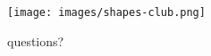 \documentclass[include/preamble.tex]{subfiles}
\begin{document}
\begin{frame}
  \begin{figure}
    \begin{center}
      \texttt{[image: images/shapes-club.png]}
    \end{center}
    \caption{questions?}
  \end{figure}
\end{frame}
\end{document}
